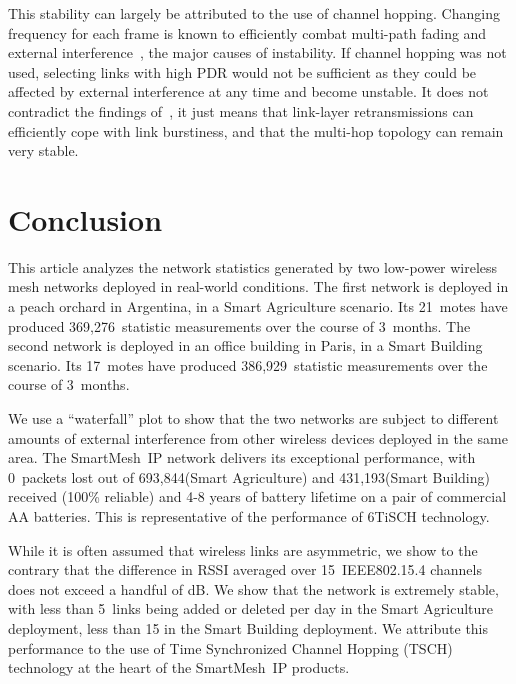 \documentclass{elsarticle}
\newcommand{\smip}                {SmartMesh~IP\xspace}
\newcommand{\building}            {Smart Building\xspace}
\newcommand{\agri}                {Smart Agriculture\xspace}
\newcommand{\PEACHNUMSTATS}       {369,276\xspace}
\newcommand{\PEACHNUMPCKTS}       {693,844\xspace}
\newcommand{\EVANUMSTATS}         {386,929\xspace}
\newcommand{\EVANUMPCKTS}         {431,193\xspace}
\begin{document}

This stability can largely be attributed to the use of channel hopping.
Changing frequency for each frame is known to efficiently combat multi-path fading and external interference~\cite{watteyne09reliability}, the major causes of instability.
If channel hopping was not used, selecting links with high PDR would not be sufficient as they could be affected by external interference at any time and become unstable.
It does not contradict the findings of~\cite{srinivasan08beta}, it just means that link-layer retransmissions can efficiently cope with link burstiness, and that the multi-hop topology can remain very stable.

\section{Conclusion}
\label{sec:conclusion}


This article analyzes the network statistics generated by two low-power wireless mesh networks deployed in real-world conditions.
The first network is deployed in a peach orchard in Argentina, in a \agri scenario.
Its 21~motes have produced \PEACHNUMSTATS~statistic measurements over the course of 3~months.
The second network is deployed in an office building in Paris, in a \building scenario.
Its 17~motes have produced \EVANUMSTATS~statistic measurements over the course of 3~months.


We use a ``waterfall'' plot to show that the two networks are subject to different amounts of external interference from other wireless devices deployed in the same area.
The \smip network delivers its exceptional performance, with 0~packets lost out of \PEACHNUMPCKTS (\agri) and \EVANUMPCKTS (\building) received (100\% reliable) and 4-8 years of battery lifetime on a pair of commercial AA batteries.
This is representative of the performance of 6TiSCH technology.


While it is often assumed that wireless links are asymmetric, we show to the contrary that the difference in RSSI averaged over 15~IEEE802.15.4 channels does not exceed a handful of dB.
We show that the network is extremely stable, with less than 5~links being added or deleted per day in the \agri deployment, less than 15 in the \building deployment.
We attribute this performance to the use of Time Synchronized Channel Hopping (TSCH) technology at the heart of the \smip products.
\end{document}
